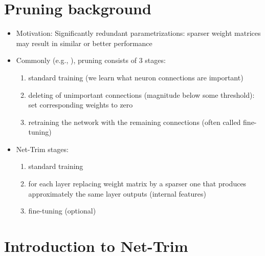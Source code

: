 \section{Pruning background}
\begin{itemize}
	\item Motivation: Significantly redundant parametrizations: sparser weight matrices may result in similar or better performance
	\item Commonly (e.g., \cite{han2015learning}), pruning consists of 3 stages:
	\begin{enumerate}
		\item standard training (we learn what neuron connections are important)
		\item deleting of unimportant connections (magnitude below some threshold): set corresponding weights to zero
		\item retraining the network with the remaining connections (often called fine-tuning)
	\end{enumerate}
	\item Net-Trim stages: 
	\begin{enumerate}
		\item standard training
		\item for each layer replacing weight matrix by a sparser one that produces approximately the same layer outputs (internal features)
		\item fine-tuning (optional)
	\end{enumerate}
\end{itemize}

\section{Introduction to Net-Trim}

